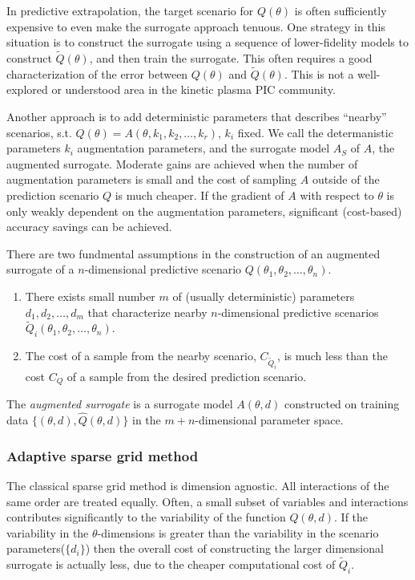In predictive extrapolation, the target scenario for $Q(\theta)$ is often sufficiently expensive to even make the surrogate 
approach tenuous.   One strategy in this
situation is to construct the surrogate using a sequence of lower-fidelity models to construct $\tilde{Q}(\theta)$, and then train the surrogate\cite{Pehermulti}.  This often requires
a good characterization of the error between $Q(\theta)$ and $\tilde{Q}(\theta)$.  This is not a well-explored or understood area in the kinetic plasma PIC community.  

Another approach is to add deterministic parameters that describes ``nearby'' scenarios,
s.t. $Q(\theta)=A(\theta,k_1,k_2,\ldots,k_r)$, $k_i$ fixed.  We call the determanistic parameters $k_i$ augmentation parameters, and the surrogate model
$A_S$ of $A$, the augmented surrogate.  Moderate gains are achieved when the number of augmentation parameters is small and the cost of sampling $A$ outside of the prediction
scenario $Q$ is much cheaper.  If the gradient of $A$ with respect to $\theta$ is only weakly dependent on the augmentation parameters, 
significant (cost-based) accuracy savings can be achieved.  

There are two fundmental assumptions in the construction of an augmented surrogate of
a $n$-dimensional predictive scenario $Q(\theta_1,\theta_2,\ldots,\theta_n)$.
\begin{enumerate}
\item There exists small number $m$ of (usually deterministic) parameters $d_1,d_2,\ldots,d_m$ that characterize
nearby $n$-dimensional predictive scenarios $\tilde{Q}_i(\theta_1,\theta_2,\ldots,\theta_n)$.
\item The cost of a sample from the nearby scenario, $C_{\tilde{Q}_i}$, is much less than the cost $C_Q$ of 
a sample from the desired prediction scenario.
\end{enumerate} 

The {\em augmented surrogate} is a surrogate model $A(\theta,d)$ constructed on training data $\{(\theta,d),\hat{Q}(\theta,d)\}$ in the $m+n$-dimensional
parameter space.   %

\subsubsection*{Adaptive sparse grid method}  
The classical sparse grid method is dimension agnostic\cite{bungartz2004}. All interactions
of the same order are treated equally. Often, a small subset of variables
and interactions contributes significantly to the variability of the function $Q(\theta,d)$.  If the variability in the $\theta$-dimensions is
greater than the variability in the scenario parameters($\{d_i\}$) then the overall cost of constructing the 
larger dimensional surrogate is actually less, due to the cheaper computational cost of $\tilde{Q}_i$.


